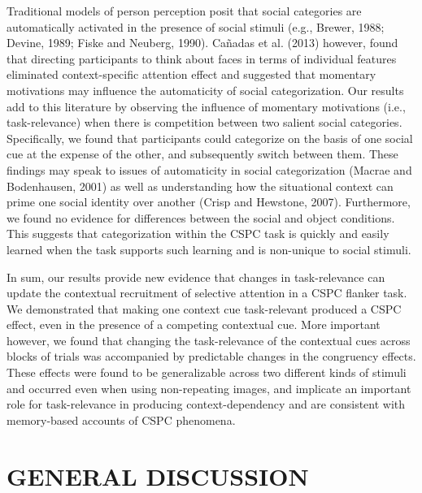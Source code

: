 \documentclass[]{DissertateCUNY}
\begin{document}
Traditional models of person perception posit that social categories are
automatically activated in the presence of social stimuli (e.g., Brewer,
1988; Devine, 1989; Fiske and Neuberg, 1990). Cañadas et al. (2013)
however, found that directing participants to think about faces in terms
of individual features eliminated context-specific attention effect and
suggested that momentary motivations may influence the automaticity of
social categorization. Our results add to this literature by observing
the influence of momentary motivations (i.e., task-relevance) when there
is competition between two salient social categories. Specifically, we
found that participants could categorize on the basis of one social cue
at the expense of the other, and subsequently switch between them. These
findings may speak to issues of automaticity in social categorization
(Macrae and Bodenhausen, 2001) as well as understanding how the
situational context can prime one social identity over another (Crisp
and Hewstone, 2007). Furthermore, we found no evidence for differences
between the social and object conditions. This suggests that
categorization within the CSPC task is quickly and easily learned when
the task supports such learning and is non-unique to social stimuli.

In sum, our results provide new evidence that changes in task-relevance
can update the contextual recruitment of selective attention in a CSPC
flanker task. We demonstrated that making one context cue task-relevant
produced a CSPC effect, even in the presence of a competing contextual
cue. More important however, we found that changing the task-relevance
of the contextual cues across blocks of trials was accompanied by
predictable changes in the congruency effects. These effects were found
to be generalizable across two different kinds of stimuli and occurred
even when using non-repeating images, and implicate an important role
for task-relevance in producing context-dependency and are consistent
with memory-based accounts of CSPC phenomena.

\FloatBarrier

\newpage
{}
\fancyhead[R]{\thepage}
\fancyfoot[C]{}

\chapter{GENERAL DISCUSSION}
\end{document}
